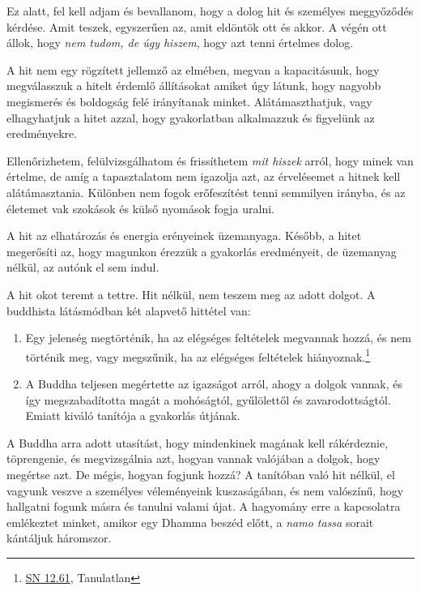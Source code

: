 Ez alatt, fel kell adjam és bevallanom, hogy a dolog hit és személyes
meggyőződés kérdése. Amit teszek, egyszerűen az, amit eldöntök ott és
akkor. A végén ott állok, hogy \emph{nem tudom, de úgy hiszem}, hogy azt
tenni értelmes dolog.

A hit nem egy rögzített jellemző az elmében, megvan a kapacitásunk, hogy
megválasszuk a hitelt érdemlő állításokat amiket úgy látunk, hogy
nagyobb megismerés és boldogság felé irányítanak minket.
Alátámaszthatjuk, vagy elhagyhatjuk a hitet azzal, hogy gyakorlatban
alkalmazzuk és figyelünk az eredményekre.

Ellenőrizhetem, felülvizsgálhatom és frissíthetem \emph{mit hiszek}
arról, hogy minek van értelme, de amíg a tapasztalatom nem igazolja azt,
az érvelésemet a hitnek kell alátámasztania. Különben nem fogok
erőfeszítést tenni semmilyen irányba, és az életemet vak szokások és
külső nyomások fogja uralni.

A hit az elhatározás és energia erényeinek üzemanyaga. Később, a hitet
megerősíti az, hogy magunkon érezzük a gyakorlás eredményeit, de
üzemanyag nélkül, az autónk el sem indul.


A hit okot teremt a tettre. Hit nélkül, nem teszem meg az adott dolgot.
A buddhista látásmódban két alapvető hittétel van:

\begin{enumerate}
\item
  Egy jelenség megtörténik, ha az elégséges feltételek megvannak hozzá,
  és nem történik meg, vagy megszűnik, ha az elégséges feltételek
  hiányoznak.\footnote{\href{https://www.dhammatalks.org/suttas/SN/SN12_61.html}{SN
    12.61}, Tanulatlan}
\item
  A Buddha teljesen megértette az igazságot arról, ahogy a dolgok
  vannak, és így megszabadította magát a mohóságtól, gyűlölettől és
  zavarodottságtól. Emiatt kiváló tanítója a gyakorlás útjának.
\end{enumerate}

A Buddha arra adott utasítást, hogy mindenkinek magának kell
rákérdeznie, töprengenie, és megvizsgálnia azt, hogyan vannak valójában
a dolgok, hogy megértse azt. De mégis, hogyan fogjunk hozzá? A tanítóban
való hit nélkül, el vagyunk veszve a személyes véleményeink
kuszaságában, és nem valószínű, hogy hallgatni fogunk másra és tanulni
valami újat. A hagyomány erre a kapcsolatra emlékeztet minket, amikor
egy Dhamma beszéd előtt, a \emph{namo tassa} sorait kántáljuk háromszor.

